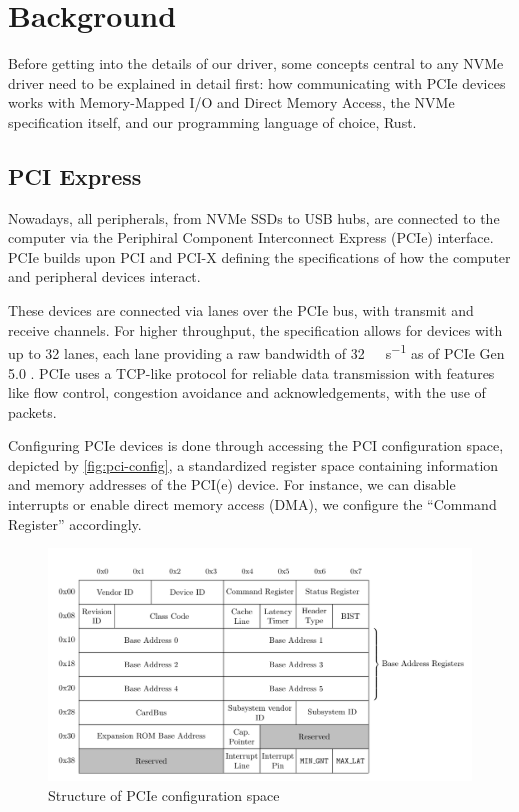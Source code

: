 \chapter{Background}\label{chapter:basics}

Before getting into the details of our driver, some concepts central to any NVMe driver need to be explained in detail first: how communicating with PCIe devices works with Memory-Mapped I/O and Direct Memory Access, the NVMe specification itself, and our programming language of choice, Rust.

\section{PCI Express}
Nowadays, all peripherals, from NVMe SSDs to USB hubs, are connected to the computer via the Periphiral Component Interconnect Express (PCIe) interface. PCIe builds upon PCI and PCI-X defining the specifications of how the computer and peripheral devices interact.

These devices are connected via lanes over the PCIe bus, with transmit and receive channels. For higher throughput, the specification allows for devices with up to 32 lanes, each lane providing a raw bandwidth of \qty[per-mode=symbol]{32}{\giga\bit\per\second} as of PCIe Gen 5.0 \cite{pcie}. PCIe uses a TCP-like protocol for reliable data transmission with features like flow control, congestion avoidance and acknowledgements, with the use of packets.

Configuring PCIe devices is done through accessing the PCI configuration space, depicted by \autoref{fig:pci-config}, a standardized register space containing information and memory addresses of the PCI(e) device. For instance, we can disable interrupts or enable direct memory access (DMA), we configure the ``Command Register'' accordingly.

\begin{figure}[H]
  \centering
    \includegraphics[width=\textwidth]{figures/pcie-config-space}
    \caption{Structure of PCIe configuration space}
    \label{fig:pci-config}
\end{figure}

